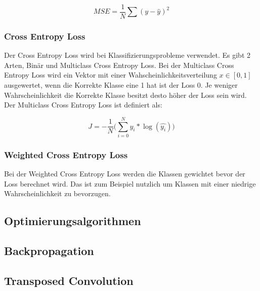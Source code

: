 \begin{equation}
  MSE = \frac{1}{N} \sum (y - \hat{y})^2
\end{equation}

\subsubsection{Cross Entropy Loss}
Der Cross Entropy Loss wird bei Klassifizierungsprobleme verwendet. Es gibt 2 Arten, Binär und Multiclass Cross Entropy Loss. 
Bei der Multiclass Cross Entropy Loss wird ein Vektor mit einer Wahscheinlichkeitsverteilung $ x \in [0, 1] $ 
ausgewertet, wenn die Korrekte Klasse eine 1 hat ist der Loss 0. Je weniger Wahrscheinlichkeit die Korrekte Klasse besitzt desto höher der Loss 
sein wird. Der Multiclass Cross Entropy Loss ist definiert als: 

\begin{equation}
  J = -\frac{1}{N} \Big(\sum_{i=0}^N y_{i} * \log(\hat{y_{i}})\Big)
\end{equation}

\subsubsection{Weighted Cross Entropy Loss}
Bei der Weighted Cross Entropy Loss werden die Klassen gewichtet bevor der Loss berechnet wird. Das ist zum Beispiel nutzlich um Klassen  
mit einer niedrige Wahrscheinlichkeit zu bevorzugen.

\subsection{Optimierungsalgorithmen}
\subsection{Backpropagation}\label{subsection:backpropagation}
\subsection{Transposed Convolution}